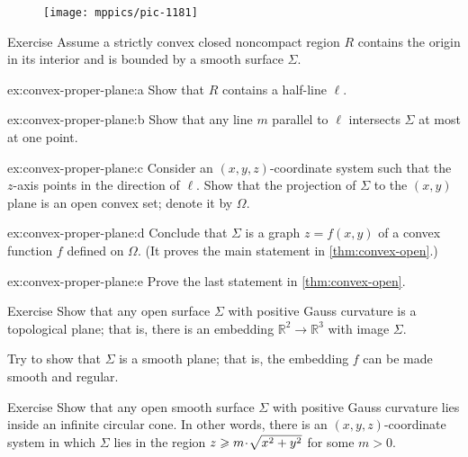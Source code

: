 {\begin{wrapfigure}{r}{33 mm}
\vskip-8mm
\centering
\texttt{[image: mppics/pic-1181]}
\end{wrapfigure}


\begin{thm}{Exercise}\label{ex:convex-proper-plane}
Assume a strictly convex closed noncompact region $R$ contains the origin in its interior and is bounded by a smooth surface $\Sigma$.

\begin{subthm}{ex:convex-proper-plane:a}
Show that $R$ contains a half-line $\ell$.
\end{subthm}

\begin{subthm}{ex:convex-proper-plane:b}
Show that any line $m$ parallel to $\ell$ intersects $\Sigma$ at most at one point.
\end{subthm}


\begin{subthm}{ex:convex-proper-plane:c}
Consider an $(x,y,z)$-coordinate system such that the $z$-axis points in the direction of $\ell$.
Show that the projection of $\Sigma$ to the $(x,y)$ plane is an open convex set; denote it by $\Omega$.
\end{subthm}

\begin{subthm}{ex:convex-proper-plane:d}
Conclude that $\Sigma$ is a graph $z=f(x,y)$ of a convex function $f$ defined on $\Omega$.
(It proves the main statement in \ref{thm:convex-open}.)
\end{subthm}

\begin{subthm}{ex:convex-proper-plane:e}
Prove the last statement in \ref{thm:convex-open}.
\end{subthm}


\end{thm}



}

\begin{thm}{Exercise}\label{ex:open+convex=plane}
Show that any open surface $\Sigma$ with positive Gauss curvature is a topological plane;
that is, there is an embedding $\mathbb{R}^2\to\mathbb{R}^3$ with image $\Sigma$.

Try to show that $\Sigma$ is a smooth plane; that is, the embedding $f$ can be made smooth and regular.
\end{thm}

\begin{thm}{Exercise}\label{ex:circular-cone}
Show that any open smooth surface $\Sigma$ with positive Gauss curvature
lies inside an infinite circular cone. In other words, there is an $(x,y,z)$-coordinate system in which $\Sigma$ lies in the region $z \z\ge m \cdot\sqrt{x^2 + y^2}$ for some $m > 0$.
\end{thm} 

